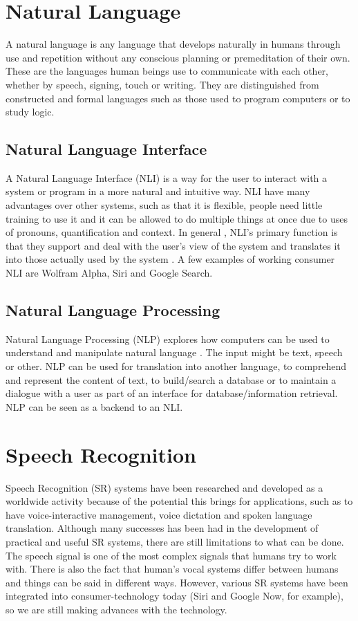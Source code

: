 \section{Natural Language}
A natural language is any language that develops naturally in humans through use and repetition without any conscious planning or premeditation of their own. These are the languages human beings use to communicate with each other, whether by speech, signing, touch or writing. They are distinguished from constructed and formal languages such as those used to program computers or to study logic.
 
\subsection{Natural Language Interface}
A Natural Language Interface (NLI) is a way for the user to interact with a system or program in a more natural and intuitive way. NLI have many advantages over other systems, such as that it is flexible, people need little training to use it and it can be allowed to do multiple things at once due to uses of pronouns, quantification and context. In general , NLI’s primary function is that they support and deal with the user’s view of the system and translates it into those actually used by the system \citep{Hend}. A few examples of working consumer NLI are Wolfram Alpha, Siri and Google Search.

\subsection{Natural Language Processing}
Natural Language Processing (NLP) explores how computers can be used to understand and manipulate natural language \citep{Gobi}. The input might be text, speech or other. NLP can be used for translation into another language, to comprehend and represent the content of text, to build/search a database or to maintain a dialogue with a user as part of an interface for database/information retrieval. \citep{Allen} NLP can be seen as a backend to an NLI.

\section{Speech Recognition}
Speech Recognition (SR) systems have been researched and developed as a worldwide activity because of the potential this brings for applications, such as to have voice-interactive management, voice dictation and spoken language translation. Although many successes has been had in the development of practical and useful SR systems, there are still limitations to what can be done. The speech signal is one of the most complex signals that humans try to work with. There is also the fact that human’s vocal systems differ between humans and things can be said in different ways. However, various SR systems have been integrated into consumer-technology today (Siri and Google Now, for example), so we are still making advances with the technology. \citep{SR}

